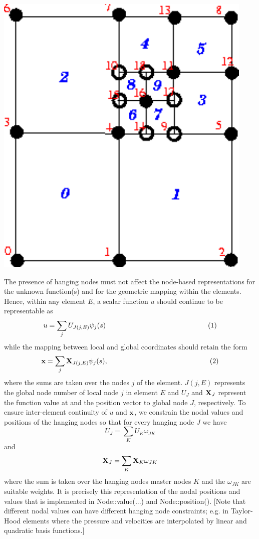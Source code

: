  
\begin{DoxyImage}
\includegraphics[width=\textwidth,height=\textheight/2,keepaspectratio=true]{HangingNodes}
\end{DoxyImage}
 The presence of hanging nodes must not affect the node-\/based representations for the unknown function(s) and for the geometric mapping within the elements. Hence, within any element $ E $, a scalar function $ u $ should continue to be representable as \[ u = \sum_{j} U_{J(j,E)} \psi_j(s) \mbox{\hspace{5cm} (1)} \] while the mapping between local and global coordinates should retain the form \[ {\bf x} = \sum_{j} {\bf X}_{J(j,E)} \psi_j(s), \mbox{\hspace{5cm} (2)} \] where the sums are taken over the nodes $ j $ of the element. $ J(j,E) $ represents the global node number of local node $ j $ in element $ E $ and $ U_J $ and $ {\bf X}_J $ represent the function value at and the position vector to global node $ J $, respectively. To ensure inter-\/element continuity of $ u $ and $ {\bf x} $, we constrain the nodal values and positions of the hanging nodes so that for every hanging node $ J $ we have \[ U_J = \sum_{K} U_{K} \omega_{JK} \] and \[ {\bf X}_J = \sum_{K} {\bf X}_{K} \omega_{JK} \] where the sum is taken over the hanging node\textquotesingle{}s master nodes $ K $ and the $ \omega_{JK} $ are suitable weights. It is precisely this representation of the nodal positions and values that is implemented in {\ttfamily Node\+::value}(...) and {\ttfamily Node\+::position()}. \mbox{[}Note that different nodal values can have different hanging node constraints; e.\+g. in Taylor-\/\+Hood elements where the pressure and velocities are interpolated by linear and quadratic basis functions.\mbox{]}

